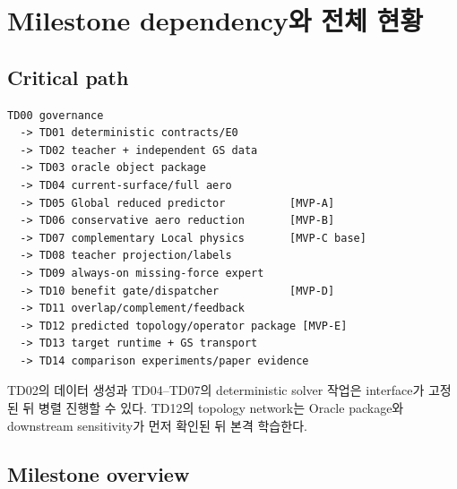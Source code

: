 \documentclass[10pt,a4paper]{article}
\begin{document}
\section{Milestone dependency와 전체 현황}

\subsection{Critical path}

\begin{lstlisting}
TD00 governance
  -> TD01 deterministic contracts/E0
  -> TD02 teacher + independent GS data
  -> TD03 oracle object package
  -> TD04 current-surface/full aero
  -> TD05 Global reduced predictor          [MVP-A]
  -> TD06 conservative aero reduction       [MVP-B]
  -> TD07 complementary Local physics       [MVP-C base]
  -> TD08 teacher projection/labels
  -> TD09 always-on missing-force expert
  -> TD10 benefit gate/dispatcher           [MVP-D]
  -> TD11 overlap/complement/feedback
  -> TD12 predicted topology/operator package [MVP-E]
  -> TD13 target runtime + GS transport
  -> TD14 comparison experiments/paper evidence
\end{lstlisting}

TD02의 데이터 생성과 TD04--TD07의 deterministic solver 작업은 interface가 고정된 뒤 병렬 진행할 수 있다.
TD12의 topology network는 Oracle package와 downstream sensitivity가 먼저 확인된 뒤 본격 학습한다.

\subsection{Milestone overview}
\end{document}
